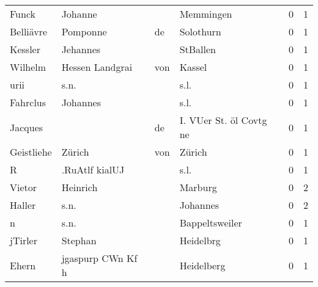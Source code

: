 \begin{tabular}{llllrr}
                    Funck &                            Johanne &             &                                   Memmingen &          0 &         1 \\
                Belliävre &                           Pomponne &          de &                                   Solothurn &          0 &         1 \\
                  Kessler &                           Jehannes &             &                                    StBallen &          0 &         1 \\
                  Wilhelm &                    Hessen Landgrai &         von &                                      Kassel &          0 &         1 \\
                     urii &                               s.n. &             &                                        s.l. &          0 &         1 \\
                 Fahrclus &                           Johannes &             &                                        s.l. &          0 &         1 \\
                  Jacques &                                    &          de &                     I. VUer St. öl Covtg ne &          0 &         1 \\
               Geistliehe &                             Zürich &         von &                                      Zürich &          0 &         1 \\
                        R &                     .RuAtlf kialUJ &             &                                        s.l. &          0 &         1 \\
                   Vietor &                           Heinrich &             &                                     Marburg &          0 &         2 \\
                   Haller &                               s.n. &             &                                    Johannes &          0 &         2 \\
                        n &                               s.n. &             &                              Bappeltsweiler &          0 &         1 \\
                  jTirler &                            Stephan &             &                                   Heidelbrg &          0 &         1 \\
                    Ehern &                  jgaspurp CWn Kf h &             &                                  Heidelberg &          0 &         1 \\

\end{tabular}
